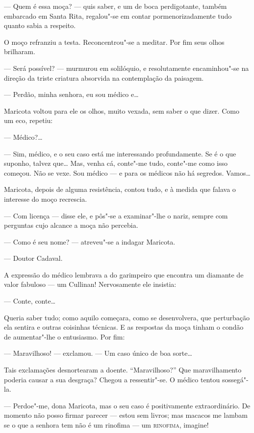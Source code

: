 --- Quem é essa moça? --- quis saber, e um de boca perdigotante, também
embarcado em Santa Rita, regalou"-se em contar pormenorizadamente tudo
quanto sabia a respeito.

O moço refranziu a testa. Reconcentrou"-se a meditar. Por fim seus olhos
brilharam.

--- Será possível? --- murmurou em solilóquio, e resolutamente
encaminhou"-se na direção da triste criatura absorvida na contemplação da
paisagem.

--- Perdão, minha senhora, eu sou médico e\ldots{}

Maricota voltou para ele os olhos, muito vexada, sem saber o que dizer.
Como um eco, repetiu:

--- Médico?\ldots{}

--- Sim, médico, e o seu caso está me interessando profundamente. Se é o
que suponho, talvez que\ldots{} Mas, venha cá, conte"-me tudo, conte"-me como
isso começou. Não se vexe. Sou médico --- e para os médicos não há
segredos. Vamos\ldots{}

Maricota, depois de alguma resistência, contou tudo, e à medida que
falava o interesse do moço recrescia.

--- Com licença --- disse ele, e pôs"-se a examinar"-lhe o nariz, sempre
com perguntas cujo alcance a moça não percebia.

--- Como é seu nome? --- atreveu"-se a indagar Maricota.

--- Doutor Cadaval.

A expressão do médico lembrava a do garimpeiro que encontra um diamante
de valor fabuloso --- um Cullinan! Nervosamente ele insistia:

--- Conte, conte\ldots{}

Queria saber tudo; como aquilo começara, como se desenvolvera, que
perturbação ela sentira e outras coisinhas técnicas. E as respostas da
moça tinham o condão de aumentar"-lhe o entusiasmo. Por fim:

--- Maravilhoso! --- exclamou. --- Um caso único de boa sorte\ldots{}

Tais exclamações desnortearam a doente. ``Maravilhoso?'' Que
maravilhamento poderia causar a sua desgraça? Chegou a ressentir"-se. O
médico tentou sossegá"-la.

--- Perdoe"-me, dona Maricota, mas o seu caso é positivamente
extraordinário. De momento não posso firmar parecer --- estou sem
livros; mas macacos me lambam se o que a senhora tem não é um rinofima
--- um \textsc{rinofima}, imagine!

